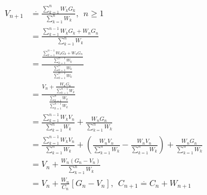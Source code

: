 \documentclass{article}
\begin{document}
\[
  \begin{aligned}
    V_{n+1} &\overset {.} {=} \frac {\sum_{k=1}^{n} W_k G_k} {\sum_{k=1}^{n} W_k}, \ \ n \geq 1 \\
    &= \frac {\sum_{k=1}^{n-1} W_k G_k + W_nG_n} {\sum_{k=1}^{n} W_k} \\
    &= \frac {\frac {\sum_{k=1}^{n-1} W_k G_k + W_nG_n} {\sum_{k=1}^{n-1} W_k}}
             {\frac {\sum_{k=1}^{n} W_k} {\sum_{k=1}^{n-1} W_k}}\\
    &= \frac {V_n + \frac {W_nG_n} {\sum_{k=1}^{n-1} W_k}}
             {\frac {\sum_{k=1}^{n} W_k} {\sum_{k=1}^{n-1} W_k}}\\
   &= \frac {\sum_{k=1}^{n-1} W_k V_n} {\sum_{k=1}^{n} W_k} + \frac {W_nG_n} {\sum_{k=1}^{n} W_k} \\
   &= \frac {\sum_{k=1}^{n-1} W_k V_n} {\sum_{k=1}^{n} W_k} +
      (\frac {W_n V_n} {\sum_{k=1}^{n} W_k} - \frac {W_n V_n} {\sum_{k=1}^{n} W_k}) +
      \frac {W_nG_n} {\sum_{k=1}^{n} W_k} \\
   &= V_n + \frac {W_n(G_n - V_n)} {\sum_{k=1}^{n} W_k} \\
   &= V_n + \frac {W_n} {C_n}[G_n - V_n], \ \ C_{n+1} \overset {.} {=} C_n + W_{n+1}
  \end{aligned}
\]
\end{document}
